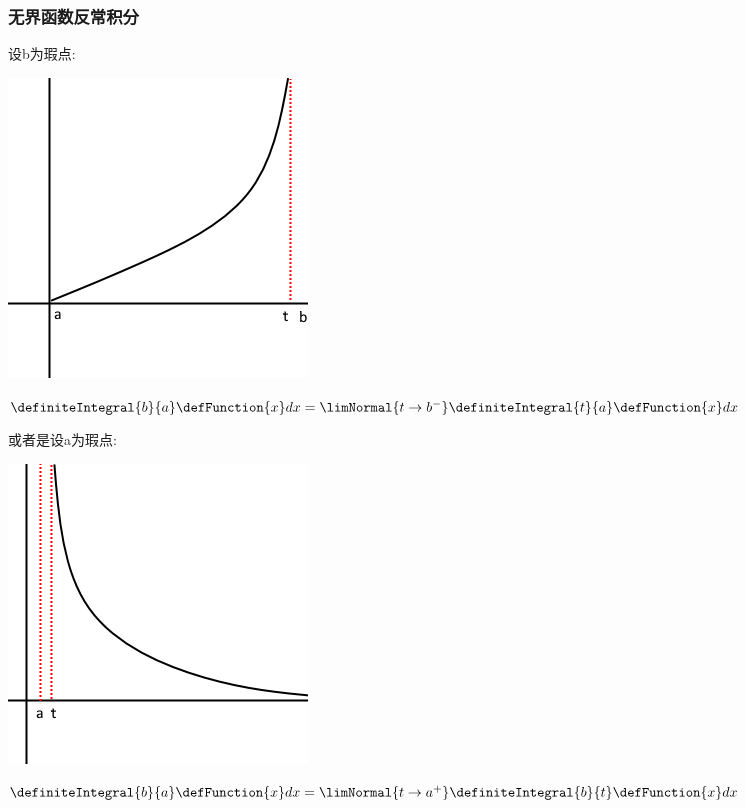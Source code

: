 {{\subsubsection{无界函数反常积分}{

  设b为瑕点:

  \begin{center}
    \includegraphics[scale=0.5]{resources/infityFunctionUnormalIntegral.png}
  \end{center}

  $\definiteIntegral{b}{a}\defFunction{x}dx = \limNormal{t \to b^-}\definiteIntegral{t}{a}\defFunction{x}dx$

  或者是设a为瑕点:

  \begin{center}
    \includegraphics[scale=0.5]{resources/infityFunctionUnormalIntegral2.png}
  \end{center}

  $\definiteIntegral{b}{a}\defFunction{x}dx = \limNormal{t \to a^+}\definiteIntegral{b}{t}\defFunction{x}dx$

}}}
